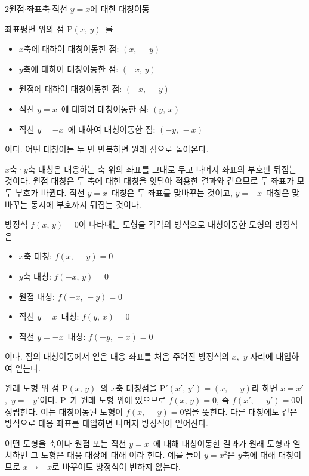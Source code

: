 \documentclass[10pt]{article}
\begin{document}
\begin{dmconcept}{2}{원점$\cdot$좌표축$\cdot$직선 $y = x$에 대한 대칭이동}
\setlength{\parskip}{1.2mm plus 1.3mm minus 0mm}\linespread{1.19}\selectfont%


좌표평면 위의 점 $\mathrm{P}(x,\, y)$\ 를
\begin{itemize}[leftmargin=8mm, itemsep=0.5mm, topsep=1mm]
  \item $x$축에 대하여 대칭이동한 점: $(x,\, -y)$
  \item $y$축에 대하여 대칭이동한 점: $(-x,\, y)$
  \item 원점에 대하여 대칭이동한 점: $(-x,\, -y)$
  \item 직선 $y = x$\ 에 대하여 대칭이동한 점: $(y,\, x)$
  \item 직선 $y = -x$\ 에 대하여 대칭이동한 점: $(-y,\, -x)$
\end{itemize}
이다. 어떤 대칭이든 두 번 반복하면 원래 점으로 돌아온다.

\begin{dmexplain}
$x$축·$y$축 대칭은 대응하는 축 위의 좌표를 그대로 두고 나머지 좌표의 부호만 뒤집는 것이다. 원점 대칭은 두 축에 대한 대칭을 잇달아 적용한 결과와 같으므로 두 좌표가 모두 부호가 바뀐다. 직선 $y = x$\ 대칭은 두 좌표를 맞바꾸는 것이고, $y = -x$\ 대칭은 맞바꾸는 동시에 부호까지 뒤집는 것이다.
\end{dmexplain}


방정식 $f(x,\, y) = 0$이 나타내는 도형을 각각의 방식으로 대칭이동한 도형의 방정식은
\begin{itemize}[leftmargin=8mm, itemsep=0.5mm, topsep=1mm]
  \item $x$축 대칭: $f(x,\, -y) = 0$
  \item $y$축 대칭: $f(-x,\, y) = 0$
  \item 원점 대칭: $f(-x,\, -y) = 0$
  \item 직선 $y = x$\ 대칭: $f(y,\, x) = 0$
  \item 직선 $y = -x$\ 대칭: $f(-y,\, -x) = 0$
\end{itemize}
이다. 점의 대칭이동에서 얻은 대응 좌표를 처음 주어진 방정식의 $x$,\ $y$ 자리에 대입하여 얻는다.

\begin{dmexplain}
원래 도형 위 점 $\mathrm{P}(x,\, y)$\ 의 $x$축 대칭점을 $\mathrm{P}'(x',\, y') = (x,\, -y)$라 하면 $x = x'$,\ $y = -y'$이다. $\mathrm{P}$\ 가 원래 도형 위에 있으므로 $f(x,\, y) = 0$, 즉 $f(x',\, -y') = 0$이 성립한다. 이는 대칭이동된 도형이 $f(x,\, -y) = 0$임을 뜻한다. 다른 대칭에도 같은 방식으로 대응 좌표를 대입하면 나머지 방정식이 얻어진다.
\end{dmexplain}

\begin{dmnote}
어떤 도형을 축이나 원점 또는 직선 $y = x$\ 에 대해 대칭이동한 결과가 원래 도형과 일치하면 그 도형은 대응 대상에 대해 이라 한다. 예를 들어 $y = x^2$은 $y$축에 대해 대칭이므로 $x \to -x$로 바꾸어도 방정식이 변하지 않는다.
\end{dmnote}

\end{dmconcept}
\end{document}
